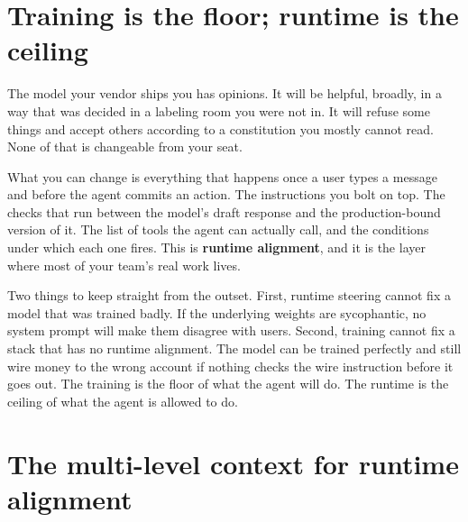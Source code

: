 \label{ch:10-alignment-03-runtime}

\starttwocol

\section{Training is the floor; runtime is the ceiling}

The model your vendor ships you has opinions. It will be helpful, broadly, in a way that was decided in a labeling room you were not in. It will refuse some things and accept others according to a constitution you mostly cannot read. None of that is changeable from your seat.

What you can change is everything that happens once a user types a message and before the agent commits an action. The instructions you bolt on top. The checks that run between the model's draft response and the production-bound version of it. The list of tools the agent can actually call, and the conditions under which each one fires. This is \textbf{runtime alignment}, and it is the layer where most of your team's real work lives.

Two things to keep straight from the outset. First, runtime steering cannot fix a model that was trained badly. If the underlying weights are sycophantic, no system prompt will make them disagree with users. Second, training cannot fix a stack that has no runtime alignment. The model can be trained perfectly and still wire money to the wrong account if nothing checks the wire instruction before it goes out. The training is the floor of what the agent will do. The runtime is the ceiling of what the agent is allowed to do.

\section{The multi-level context for runtime alignment}

